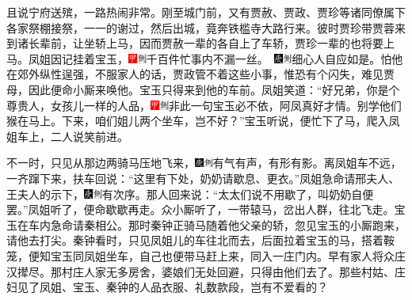 且说宁府送殡，一路热闹非常。刚至城门前，又有贾赦、贾政、贾珍等诸同僚属下各家祭棚接祭，一一的谢过，然后出城，竟奔铁槛寺大路行来。彼时贾珍带贾蓉来到诸长辈前，让坐轿上马，因而贾赦一辈的各自上了车轿，贾珍一辈的也将要上马。凤姐因记挂着宝玉，{\includegraphics[width=3mm]{../Images/00002}\includegraphics[width=3mm]{../Images/00011}\footnotesize \kaishu 千百件忙事内不漏一丝。　\includegraphics[width=3mm]{../Images/00004}\includegraphics[width=3mm]{../Images/00011}\footnotesize \kaishu 细心人自应如是。}怕他在郊外纵性逞强，不服家人的话，贾政管不着这些小事，惟恐有个闪失，难见贾母，因此便命小厮来唤他。宝玉只得来到他的车前。凤姐笑道：“好兄弟，你是个尊贵人，女孩儿一样的人品，{\includegraphics[width=3mm]{../Images/00002}\includegraphics[width=3mm]{../Images/00011}\footnotesize \kaishu 非此一句宝玉必不依，阿凤真好才情。}别学他们猴在马上。下来，咱们姐儿两个坐车，岂不好？”宝玉听说，便忙下了马，爬入凤姐车上，二人说笑前进。

不一时，只见从那边两骑马压地飞来，{\includegraphics[width=3mm]{../Images/00004}\includegraphics[width=3mm]{../Images/00011}\footnotesize \kaishu 有气有声，有形有影。}离凤姐车不远，一齐蹿下来，扶车回说：“这里有下处，奶奶请歇息、更衣。”凤姐急命请邢夫人、王夫人的示下，{\includegraphics[width=3mm]{../Images/00004}\includegraphics[width=3mm]{../Images/00011}\footnotesize \kaishu 有次序。}那人回来说：“太太们说不用歇了，叫奶奶自便罢。”凤姐听了，便命歇歇再走。众小厮听了，一带辕马，岔出人群，往北飞走。宝玉在车内急命请秦相公。那时秦钟正骑马随着他父亲的轿，忽见宝玉的小厮跑来，请他去打尖。秦钟看时，只见凤姐儿的车往北而去，后面拉着宝玉的马，搭着鞍笼，便知宝玉同凤姐坐车，自己也便带马赶上来，同入一庄门内。早有家人将众庄汉撵尽。那村庄人家无多房舍，婆娘们无处回避，只得由他们去了。那些村姑、庄妇见了凤姐、宝玉、秦钟的人品衣服、礼数款段，岂有不爱看的？

